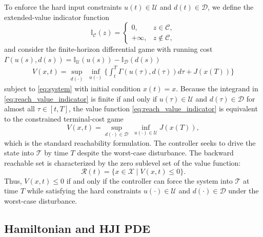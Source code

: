 \documentclass[letterpaper, 10 pt, conference]{ieeeconf}
\theoremstyle{plain}
\theoremstyle{definition}
\begin{document}
To enforce the hard input constraints $u(t)\in\mathcal{U}$ and $d(t)\in\mathcal{D}$, we define the extended-value indicator function
\begin{equation}
    \mathbb{I}_{\mathcal{C}}(z)
    =
    \begin{cases}
        0, & z\in\mathcal{C},\\
        +\infty, & z\notin\mathcal{C},
    \end{cases}
    \label{eq:indicator}
\end{equation}
and consider the finite-horizon differential game with running cost $\Gamma(u(s),d(s)) = \mathbb{I}_{\mathcal{U}}(u(s))-\mathbb{I}_{\mathcal{D}}(d(s))$ 
\begin{equation}
    \begin{aligned}
        V(x,t)
        =
        \sup_{d(\cdot)}\;\inf_{u(\cdot)}
        \Bigg\{
        \int_t^T \Gamma(u(\tau),d(\tau)) d\tau + J(x(T)) \Bigg\}
    \end{aligned}
    \label{eq:reach_value_indicator}
\end{equation}
subject to \eqref{eq:system} with initial condition $x(t)=x$. Because the integrand in \eqref{eq:reach_value_indicator} is finite if and only if $u(\tau)\in\mathcal{U}$ and $d(\tau)\in\mathcal{D}$ for almost all $\tau\in[t,T]$, the value function \eqref{eq:reach_value_indicator} is equivalent to the constrained terminal-cost game
\begin{equation}
    V(x,t)
    =
    \sup_{d(\cdot)\in\mathcal{D}}\;\inf_{u(\cdot)\in\mathcal{U}} J(x(T)),
    \label{eq:reach_value_constrained}
\end{equation}
which is the standard reachability formulation. The controller seeks to drive the state into $\mathcal{T}$ by time $T$ despite the worst-case disturbance. The backward reachable set is characterized by the zero sublevel set of the value function:
\begin{equation}
    \mathcal{R}(t)
    =
    \{ x \in \mathcal{X} \mid V(x,t) \le 0 \}.
    \label{eq:brs_def}
\end{equation}
Thus, $V(x,t)\le 0$ if and only if the controller can force the system into $\mathcal{T}$ at time $T$ while satisfying the hard constraints $u(\cdot)\in\mathcal{U}$ and $d(\cdot)\in\mathcal{D}$ under the worst-case disturbance.



\subsection{Hamiltonian and HJI PDE}
\end{document}

